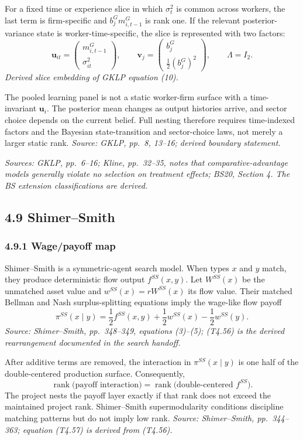 \documentclass[11pt]{article}
\begin{document}
For a fixed time or experience slice in which \(\sigma_t^2\) is common across
workers, the last term is firm-specific and
\(b_j^Gm_{i,t-1}^G\) is rank one.  If the relevant posterior-variance state is
worker-time-specific, the slice is represented with two factors:
\[
\mathbf u_{it}
=
\begin{pmatrix}
m_{i,t-1}^G\\
\sigma_{it}^2
\end{pmatrix},
\qquad
\mathbf v_j
=
\begin{pmatrix}
b_j^G\\
\frac12(b_j^G)^2
\end{pmatrix},
\qquad
\Lambda=I_2.
\tag{T4.55}
\]
\textit{Derived slice embedding of GKLP equation (10).}

The pooled learning panel is not a static worker-firm surface with a
time-invariant \(\mathbf u_i\).  The posterior mean changes as output histories
arrive, and sector choice depends on the current belief.  Full nesting
therefore requires time-indexed factors and the Bayesian state-transition and
sector-choice laws, not merely a larger static rank.
\textit{Source: GKLP, pp.\ 8, 13--16; derived boundary statement.}

\textit{Sources: GKLP, pp.\ 6--16; Kline, pp.\ 32--35, notes that
comparative-advantage models generally violate no selection on treatment
effects; BS20, Section 4.  The BS extension classifications are derived.}

\subsection{4.9 Shimer--Smith}

\subsubsection{4.9.1 Wage/payoff map}

Shimer--Smith is a symmetric-agent search model.  When types \(x\) and \(y\)
match, they produce deterministic flow output \(f^{SS}(x,y)\).  Let
\(W^{SS}(x)\) be the unmatched asset value and
\(w^{SS}(x)=rW^{SS}(x)\) its flow value.  Their matched Bellman and Nash
surplus-splitting equations imply the wage-like flow payoff
\[
\pi^{SS}(x\mid y)
=
\frac12f^{SS}(x,y)
+\frac12w^{SS}(x)
-\frac12w^{SS}(y).
\tag{T4.56}
\]
\textit{Source: Shimer--Smith, pp.\ 348--349, equations (3)--(5);
(T4.56) is the derived rearrangement documented in the search handoff.}

After additive terms are removed, the interaction in
\(\pi^{SS}(x\mid y)\) is one half of the double-centered production surface.
Consequently,
\[
\operatorname{rank}
\bigl(
\text{payoff interaction}
\bigr)
=
\operatorname{rank}
\bigl(
\text{double-centered }f^{SS}
\bigr).
\tag{T4.57}
\]
The project nests the payoff layer exactly if that rank does not exceed the
maintained project rank.  Shimer--Smith supermodularity conditions discipline
matching patterns but do not imply low rank.
\textit{Source: Shimer--Smith, pp.\ 344--363; equation (T4.57) is derived
from (T4.56).}
\end{document}
